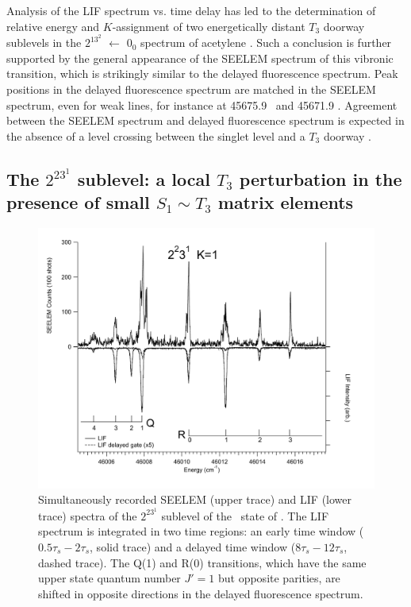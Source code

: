 \documentclass[12pt]{mitthesis}
\begin{document}
Analysis of the LIF spectrum vs. time delay has led to the
determination of relative energy and $K$-assignment of two
energetically distant $T_3$ doorway sublevels in the $2^13^2$ 
$\leftarrow$ $0_0$ spectrum of acetylene \astate.  Such a conclusion
is further supported by the general appearance of the SEELEM spectrum
of this vibronic transition, which is strikingly similar to the
delayed fluorescence spectrum.  Peak positions in the delayed
fluorescence spectrum are matched in the SEELEM spectrum, even for
weak lines, for instance at 45675.9 \rcm\ and 45671.9 \rcm.  Agreement
between the SEELEM spectrum and delayed fluorescence spectrum is
expected in the absence of a level crossing between the singlet level
and a $T_3$ doorway \cite{altunata01}.


\subsection{The $2^23^1$  sublevel: a local $T_3$
  perturbation in the presence of small $S_1 \sim T_3$ matrix
  elements}



\begin{figure}
  \caption{Simultaneously recorded SEELEM (upper trace) and LIF (lower
    trace) spectra of the $2^23^1$  sublevel of the \astate\
    state of .  The LIF spectrum is integrated in two time
    regions: an early time window ($0.5\tau_s-2\tau_s$, solid trace)
    and a delayed time window ($8\tau_s-12\tau_s$, dashed trace).  The
    Q(1) and R(0) transitions, which have the same upper state quantum
    number $J'=1$ but opposite parities, are shifted in opposite
    directions in the delayed fluorescence spectrum.}
  \label{fig:spectrum-2231}
  \centering
  \vspace{1cm}
  \includegraphics[width=7in,angle=90]{spectrum-2231-q4r3.pdf}
\end{figure}
\end{document}
